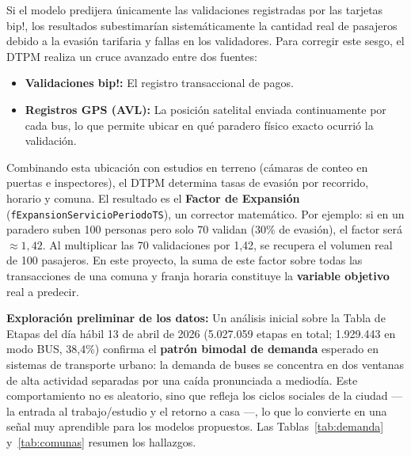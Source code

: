 \documentclass[11pt,letterpaper]{article}
\begin{document}
\vspace{0.5em}
\begin{tcolorbox}[colback=primary!5, colframe=primary, title=\textbf{Nota Técnica: Estimación de Demanda Real y Factor de Expansión}, arc=1mm]
\small
Si el modelo predijera únicamente las validaciones registradas por las tarjetas bip!, los resultados subestimarían sistemáticamente la cantidad real de pasajeros debido a la evasión tarifaria y fallas en los validadores. Para corregir este sesgo, el DTPM realiza un cruce avanzado entre dos fuentes:
\begin{itemize}[leftmargin=1.5em, topsep=2pt, itemsep=0pt]
    \item \textbf{Validaciones bip!:} El registro transaccional de pagos.
    \item \textbf{Registros GPS (AVL):} La posición satelital enviada continuamente por cada bus, lo que permite ubicar en qué paradero físico exacto ocurrió la validación.
\end{itemize}
Combinando esta ubicación con estudios en terreno (cámaras de conteo en puertas e inspectores), el DTPM determina tasas de evasión por recorrido, horario y comuna. El resultado es el \textbf{Factor de Expansión} (\texttt{fExpansionServicioPeriodoTS}), un corrector matemático. Por ejemplo: si en un paradero suben 100 personas pero solo 70 validan (30\% de evasión), el factor será $\approx 1{,}42$. Al multiplicar las 70 validaciones por 1,42, se recupera el volumen real de 100 pasajeros. En este proyecto, la suma de este factor sobre todas las transacciones de una comuna y franja horaria constituye la \textbf{variable objetivo} real a predecir.
\end{tcolorbox}
\vspace{0.5em}

\noindent\textbf{Exploración preliminar de los datos:} Un análisis inicial sobre la Tabla de Etapas del día hábil 13 de abril de 2026 (5.027.059 etapas en total; 1.929.443 en modo BUS, 38{,}4\%) confirma el \textbf{patrón bimodal de demanda} esperado en sistemas de transporte urbano: la demanda de buses se concentra en dos ventanas de alta actividad separadas por una caída pronunciada a mediodía. Este comportamiento no es aleatorio, sino que refleja los ciclos sociales de la ciudad — la entrada al trabajo/estudio y el retorno a casa —, lo que lo convierte en una señal muy aprendible para los modelos propuestos. Las Tablas~\ref{tab:demanda} y~\ref{tab:comunas} resumen los hallazgos.
\end{document}

